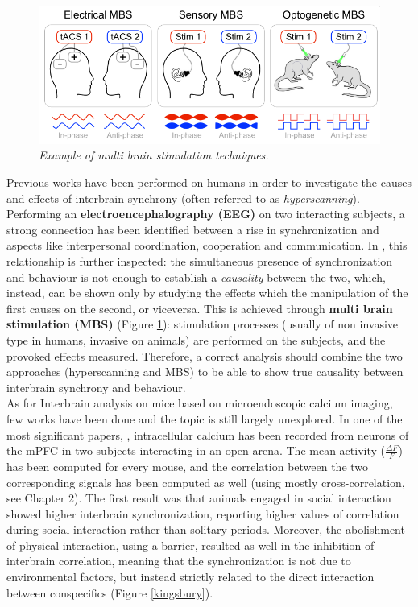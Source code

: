 \documentclass[12pt, a4paper]{report}
\begin{document}
\begin{figure}[H]
	\begin{center}
		\includegraphics[scale=.70]{novembre.png} 
	\end{center} 
	\caption{\textit{Example of multi brain stimulation techniques.}} \label{mbs}
	
\end{figure}
Previous works \cite{14} %
 have been performed on humans in order to investigate the causes and effects of interbrain synchrony (often referred to as \textit{hyperscanning}). Performing an \textbf{electroencephalography (EEG)} on two interacting subjects, a strong connection has been identified between a rise in synchronization  and aspects like interpersonal coordination, cooperation and communication. In \cite{15}, %
 this relationship is further inspected: the simultaneous presence of synchronization and behaviour is not enough to establish a \textit{causality} between the two, which, instead, can be shown only by studying the effects which the manipulation of the first causes on the second, or viceversa. This is achieved through \textbf{multi brain stimulation (MBS)} (Figure \ref{mbs}): stimulation processes (usually of non invasive type in humans, invasive on animals) are performed on the subjects, and the provoked effects measured. Therefore, a correct analysis should combine the two approaches (hyperscanning and MBS) to be able to show true causality between interbrain synchrony and behaviour.
\\

As for Interbrain analysis on mice based on microendoscopic calcium imaging, few works have been done and the topic is still largely unexplored. In one of the most significant papers, \cite{16}, %
 intracellular calcium has been recorded from neurons of the mPFC in two subjects interacting in an open arena.  The mean activity ($\frac{\Delta F }{F}$) has been computed for every mouse, and the correlation between the two corresponding signals has been computed as well (using mostly cross-correlation, see Chapter 2). The first result was that animals engaged in social interaction showed higher interbrain synchronization, reporting higher values of correlation during social interaction rather than solitary periods. Moreover, the abolishment of physical interaction, using a barrier, resulted as well in the inhibition of interbrain correlation, meaning that the synchronization is not due to environmental factors, but instead strictly related to the direct interaction between conspecifics (Figure \ref{kingsbury}).\\
\end{document}
